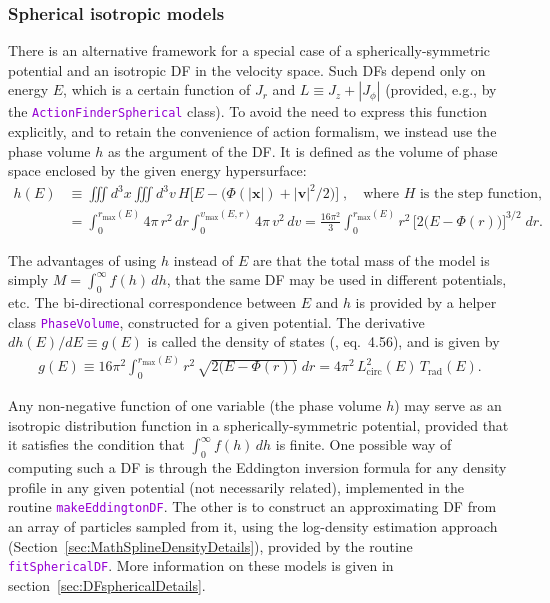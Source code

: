 \documentclass[12pt]{article}
\newcommand{\ttt}[1]{\textcolor{darkviolet}{\texttt{#1}}}
\newcommand{\bv}{\boldsymbol{v}}
\newcommand{\bx}{\boldsymbol{x}}
\begin{document}
\subsubsection{Spherical isotropic models}  \label{sec:DFspherical}

There is an alternative framework for a special case of a spherically-symmetric potential and an isotropic DF in the velocity space. Such DFs depend only on energy $E$, which is a certain function of $J_r$ and $L\equiv J_z+|J_\phi|$ (provided, e.g., by the \ttt{ActionFinderSpherical} class).
To avoid the need to express this function explicitly, and to retain the convenience of action formalism, we instead use the phase volume $h$ as the argument of the DF. It is defined as the volume of phase space enclosed by the given energy hypersurface:
\begin{align*}
h(E) &\equiv \iiint d^3x \iiint d^3v\, H\Big[E - \big(\Phi(|\bx|)+|\bv|^2/2\big)\Big] \;,\quad
\mbox{where $H$ is the step function,} \\
&= \int_0^{r_\mathrm{max}(E)} 4\pi\,r^2\,dr \int_0^{v_\mathrm{max}(E,r)} 4\pi\, v^2\,dv =
\frac{16\pi^2}{3} \int_0^{r_\mathrm{max}(E)} r^2\, \Big[2\big(E-\Phi(r)\big)\Big]^{3/2}\;dr.
\end{align*}

The advantages of using $h$ instead of $E$ are that the total mass of the model is simply $M=\int_0^\infty f(h)\,dh$, that the same DF may be used in different potentials, etc. The bi-directional correspondence between $E$ and $h$ is provided by a helper class \ttt{PhaseVolume}, constructed for a given potential. The derivative $dh(E)/dE \equiv g(E)$ is called the density of states (\cite{BinneyTremaine}, eq.~4.56), and is given by
\begin{align*}
g(E) \equiv 16\pi^2 \int_0^{r_\mathrm{max}(E)} r^2\, \sqrt{2\big(E-\Phi(r)\big)}\;dr 
= 4\pi^2\,L^2_\mathrm{circ}(E)\,T_\mathrm{rad}(E).
\end{align*}

Any non-negative function of one variable (the phase volume $h$) may serve as an isotropic distribution function in a spherically-symmetric potential, provided that it satisfies the condition that $\int_0^\infty f(h)\, dh$ is finite. 
One possible way of computing such a DF is through the Eddington inversion formula for any density profile in any given potential (not necessarily related), implemented in the routine \ttt{makeEddingtonDF}. The other is to construct an approximating DF from an array of particles sampled from it, using the log-density estimation approach (Section~\ref{sec:MathSplineDensityDetails}), provided by the routine \ttt{fitSphericalDF}.
More information on these models is given in section~\ref{sec:DFsphericalDetails}.
\end{document}
